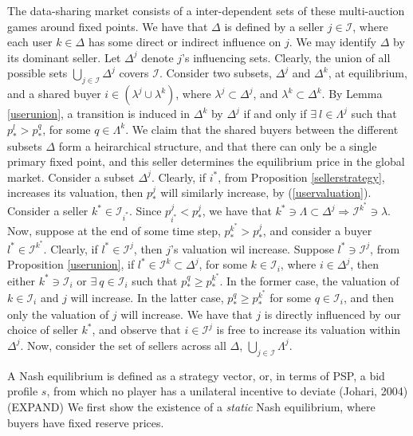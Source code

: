 \documentclass[sigconf, anonymous]{acmart}
\newcommand{\mcI}{\mathcal{I}}
\theoremstyle{definition}
\begin{document}
The data-sharing market consists of a inter-dependent sets of these
multi-auction games around fixed points. We have that $\Delta$ is defined by a seller $j\in\mcI$, where each
user $k\in\Delta$ has some direct or indirect influence on $j$. 
We may identify $\Delta$ by its dominant seller. Let $\Delta^j$ denote $j$'s
influencing sets. Clearly, the union of all possible
sets $\bigcup_{j\in\mcI} \Delta^j$ covers $\mcI$. Consider two subsets, $\Delta^j$
and $\Delta^k$, at equilibrium, and a shared
buyer $i\in (\lambda^j \cup \lambda^k)$, where
$\lambda^j\subset\Delta^j$, and  $\lambda^k\subset \Delta^k$.  By Lemma
\ref{userunion}, a transition is induced in $\Delta^k$ by $\Delta^j$ if and only if
$\exists \ l \in \Lambda^j$ such that $p_*^{l} > p_*^{q}$, for some
$q\in\Lambda^k$. We claim that the shared buyers
between the different subsets $\Delta$ form a heirarchical structure, and that
there can only be a single primary fixed point, and this seller determines
the equilibrium price in the global market. Consider a subset $\Delta^j$. Clearly, if $i^*$, from Proposition
\ref{sellerstrategy}, increases its valuation,
then $p_*^j$ will similarly increase, by (\ref{uservaluation}). Consider a
seller $k^*\in\mcI_{i^*}$. Since $p_{i^*}^j <
p_*^j$, we have that $k^*\ni\Lambda\subset \Delta^j\Rightarrow \mcI^{k^*} \ni
\lambda$. Now, suppose at the end of some time step, $p_*^{k^*} > p_*^j$, and
consider a buyer $l^*\in\mcI^{k^*}$. Clearly, if $l^*\in\mcI^j$, then $j$'s
valuation wil increase. Suppose $l^*\ni\mcI^j$, from Proposition \ref{userunion}, if $l^*\in\mcI^k\subset
\Delta^j$, for some $k\in\mcI_i$, where $i\in\Delta^j$, then either
$k^*\ni\mcI_i$ or $\exists \ q\in\mcI_i$ such that $p_*^q \ge p_*^{k^*}$. In
the former case, the valuation of $k\in\mcI_i$ and $j$ will increase.
In the latter case, $p_*^q \ge p_*^{k^*}$ for some
$q\in\mcI_i$, and then only the valuation of $j$ will increase. We have that $j$ is
directly influenced by our choice of seller $k^*$, and observe that
$i\in\mcI^j$ is free to increase its valuation within $\Delta^j$. 
Now, consider the set of sellers across all $\Delta$,
$\bigcup_{j\in\mcI}\Lambda^j$.









A Nash equilibrium is defined as a strategy vector, or, in terms of PSP, a bid
profile $s$,
from which no player has a unilateral incentive to deviate (Johari, 2004)
(EXPAND)
We first show the existence of a \emph{static} Nash equilibrium, where buyers have fixed reserve
prices.
\end{document}
